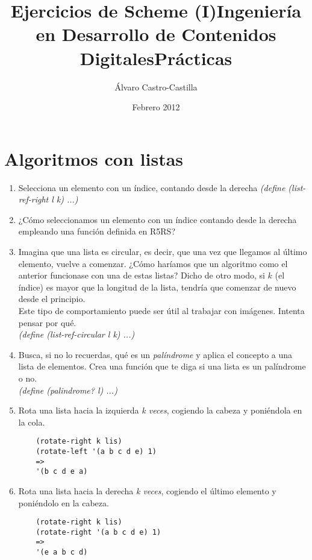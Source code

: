 \documentclass[11pt]{article}
\title{Ejercicios de Scheme (I)\linebreak Ingeniería en Desarrollo de Contenidos Digitales\linebreak Prácticas}
\author{Álvaro Castro-Castilla}
\date{Febrero 2012}
\begin{document}
\maketitle


\section{Algoritmos con listas}
\begin{enumerate}
  \item Selecciona un elemento con un índice, contando desde la derecha
    \newline \textit{(define (list-ref-right l k) ...)}

  \item ¿Cómo seleccionamos un elemento con un índice contando desde la derecha empleando una función definida en R5RS?

  \item Imagina que una lista es circular, es decir, que una vez que llegamos al último elemento, vuelve a comenzar. ¿Cómo haríamos que un algoritmo como el anterior funcionase con una de estas listas? Dicho de otro modo, si $k$ (el índice) es mayor que la longitud de la lista, tendría que comenzar de nuevo desde el principio.
    \\[3mm]
    Este tipo de comportamiento puede ser útil al trabajar con imágenes. Intenta pensar por qué.
    \\[3mm]
    \textit{(define (list-ref-circular l k) ...)}

  \item Busca, si no lo recuerdas, qué es un \textit{palíndrome} y aplica el concepto a una lista de elementos. Crea una función que te diga si una lista es un palíndrome o no.
    \\[3mm]
    \textit{(define (palindrome? l) ...)}

  \item Rota una lista hacia la izquierda \textit{k veces}, cogiendo la cabeza y poniéndola en la cola.
\begin{verbatim}
    (rotate-right k lis)
    (rotate-left '(a b c d e) 1)
    =>
    '(b c d e a)
\end{verbatim}

  \item Rota una lista hacia la derecha \textit{k veces}, cogiendo el último elemento y poniéndolo en la cabeza.
\begin{verbatim}
    (rotate-right k lis)
    (rotate-right '(a b c d e) 1)
    =>
    '(e a b c d)
\end{verbatim}


\end{enumerate}
\end{document}
